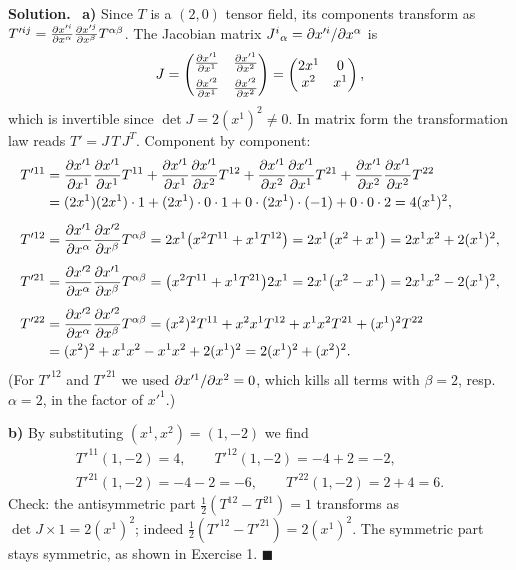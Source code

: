 \documentclass[11pt,a4paper]{article}
\numberwithin{equation}{subsection}
\newenvironment{solution}{\par\noindent\textbf{\textcolor{excol!70!black}{Solution.}}\ }{\hfill$\blacksquare$\par\medskip}
\newcommand{\added}[1]{{\color{teal!60!black}#1}}
\begin{document}
\begin{solution}
\textbf{a)} Since $T$ is a $(2,0)$ tensor field, its components transform as $T'^{ij}=\frac{\partial x'^i}{\partial x^\alpha}\frac{\partial x'^j}{\partial x^\beta}T^{\alpha\beta}$. The Jacobian matrix $J^i{}_\alpha=\partial x'^i/\partial x^\alpha$ is
\[
  J=\begin{pmatrix}\frac{\partial x'^1}{\partial x^1}&\frac{\partial x'^1}{\partial x^2}\\[1ex]\frac{\partial x'^2}{\partial x^1}&\frac{\partial x'^2}{\partial x^2}\end{pmatrix}
  =\begin{pmatrix}2x^1&0\\ x^2&x^1\end{pmatrix},
\]
which is invertible since $\det J=2(x^1)^2\neq0$. In matrix form the transformation law reads $T'=J\,T\,J^T$. Component by component:
\begin{align*}
  T'^{11}&=\frac{\partial x'^1}{\partial x^1}\frac{\partial x'^1}{\partial x^1}T^{11}+\frac{\partial x'^1}{\partial x^1}\frac{\partial x'^1}{\partial x^2}T^{12}+\frac{\partial x'^1}{\partial x^2}\frac{\partial x'^1}{\partial x^1}T^{21}+\frac{\partial x'^1}{\partial x^2}\frac{\partial x'^1}{\partial x^2}T^{22}\\
  &=(2x^1)(2x^1)\cdot1+(2x^1)\cdot0\cdot1+0\cdot(2x^1)\cdot(-1)+0\cdot0\cdot2=4(x^1)^2,\\[1ex]
  T'^{12}&=\frac{\partial x'^1}{\partial x^\alpha}\frac{\partial x'^2}{\partial x^\beta}T^{\alpha\beta}=2x^1\big(x^2T^{11}+x^1T^{12}\big)=2x^1\big(x^2+x^1\big)=2x^1x^2+2(x^1)^2,\\[1ex]
  T'^{21}&=\frac{\partial x'^2}{\partial x^\alpha}\frac{\partial x'^1}{\partial x^\beta}T^{\alpha\beta}=\big(x^2T^{11}+x^1T^{21}\big)2x^1=2x^1\big(x^2-x^1\big)=2x^1x^2-2(x^1)^2,\\[1ex]
  T'^{22}&=\frac{\partial x'^2}{\partial x^\alpha}\frac{\partial x'^2}{\partial x^\beta}T^{\alpha\beta}=(x^2)^2T^{11}+x^2x^1T^{12}+x^1x^2T^{21}+(x^1)^2T^{22}\\
  &=(x^2)^2+x^1x^2-x^1x^2+2(x^1)^2=2(x^1)^2+(x^2)^2 .
\end{align*}
(For $T'^{12}$ and $T'^{21}$ we used $\partial x'^1/\partial x^2=0$, which kills all terms with $\beta=2$, resp.\ $\alpha=2$, in the factor of $x'^1$.)

\textbf{b)} By substituting $(x^1,x^2)=(1,-2)$ we find
\begin{gather*}
  T'^{11}(1,-2)=4,\qquad T'^{12}(1,-2)=-4+2=-2,\\ T'^{21}(1,-2)=-4-2=-6,\qquad T'^{22}(1,-2)=2+4=6 .
\end{gather*}
\added{Check: the antisymmetric part $\frac12(T^{12}-T^{21})=1$ transforms as $\det J\times1=2(x^1)^2$; indeed $\frac12(T'^{12}-T'^{21})=2(x^1)^2$. The symmetric part stays symmetric, as shown in Exercise 1.}
\end{solution}
\end{document}
